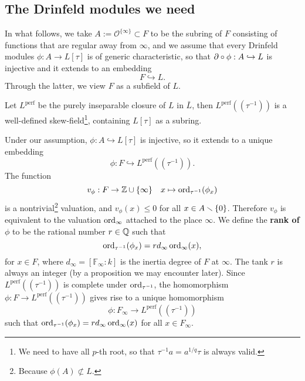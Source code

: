 \documentclass{article}
\newcommand{\F}{\mathbb{F}}
\newcommand{\perf}{\mathrm{perf}}
\renewcommand{\O}{\mathcal{O}}
\begin{document}


\subsection{The Drinfeld modules we need}

In what follows, we take $A := \O^{\{\infty\}}\subset F$ to be the subring of $F$ consisting of functions that are regular away from $\infty$,
and we assume that every Drinfeld modules $\phi : A\to L[\tau]$ is of generic characteristic,
so that $\partial\circ \phi : A\hookrightarrow L$ is injective and it extends to an embedding \[F\hookrightarrow L.\]
Through the latter, we view $F$ as a subfield of $L$.


Let $L^\perf$ be the purely inseparable closure of $L$ in $\bar L$,
then $L^\perf((\tau^{-1}))$ is a well-defined skew-field\footnote{
    We need to have all $p$-th root,
    so that $\tau^{-1}a = a^{1/q}\tau$ is always valid.
}, containing $L[\tau]$ as a subring.


Under our assumption,
$\phi : A\hookrightarrow L[\tau]$ is injective, so it extends to a unique embedding
\[\phi : F\hookrightarrow L^{\perf}((\tau^{-1})).\]
The function \[v_\phi : F\to \mathbb{Z}\cup\{\infty\}\quad x\mapsto \operatorname{ord}_{\tau^{-1}}(\phi_x) \]
is a nontrivial\footnote{
    Because $\phi(A)\not\subset L$.
} valuation, and $v_\phi(x)\le 0$ for all $x\in A\smallsetminus\{0\}$.
Therefore $v_\phi$ is equivalent to the valuation $\operatorname{ord}_\infty$ attached to the place $\infty$.
We define the \textbf{rank of $\phi$} to be the rational number $r\in\mathbb{Q}$ such that
\begin{equation}\label{eq: def of rank}
    \operatorname{ord}_{\tau^{-1}}(\phi_x) = rd_\infty\operatorname{ord}_\infty(x),
\end{equation}
for $x\in F$, where $d_\infty = [\F_\infty : k]$ is the inertia degree of $F$ at $\infty$.
The tank $r$ is always an integer (by a proposition we may encounter later).
Since $L^\perf((\tau^{-1}))$ is complete under $\operatorname{ord}_{\tau^{-1}}$, the homomorphism $\phi : F\to L^\perf((\tau^{-1}))$ gives rise to a unique homomorphism
\[\phi : F_\infty\to L^\perf((\tau^{-1}))\]
such that $\operatorname{ord}_{\tau^{-1}}(\phi_x) = rd_\infty\operatorname{ord}_\infty(x)$ for all $x\in F_\infty$.
\end{document}
